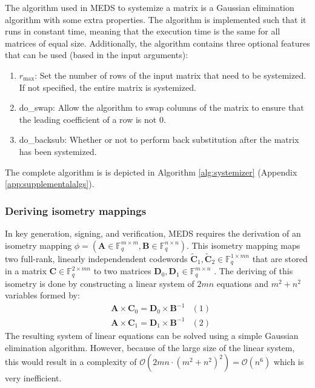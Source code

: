 \documentclass[11pt,a4paper]{report}
\theoremstyle{definition}
\begin{document}
The algorithm used in MEDS to systemize a matrix is a Gaussian elimination algorithm with some extra properties. The algorithm is implemented such that it runs in constant time, meaning that the execution time is the same for all matrices of equal size. Additionally, the algorithm contains three optional features that can be used (based in the input arguments):
\begin{enumerate}
  \item $r_{\text{max}}$: Set the number of rows of the input matrix that need to be systemized. If not specified, the entire matrix is systemized.
  \item do\_swap: Allow the algorithm to swap columns of the matrix to ensure that the leading coefficient of a row is not 0.
  \item do\_backsub: Whether or not to perform back substitution after the matrix has been systemized.
\end{enumerate}
The complete algorithm is is depicted in Algorithm \ref{alg:systemizer} (Appendix \ref{app:supplementalalgs}).

\subsubsection{Deriving isometry mappings}
\label{sec:derivingisometry}
In key generation, signing, and verification, MEDS requires the derivation of an isometry mapping $\phi = (\textbf{A} \in \mathbb{F}_q^{m \times m}, \textbf{B} \in \mathbb{F}_q^{n \times n})$. This isometry mapping maps two full-rank, linearly independendent codewords $\tilde{\textbf{C}}_1, \tilde{\textbf{C}}_2 \in \mathbb{F}_q^{1 \times mn}$ that are stored in a matrix $\textbf{C} \in \mathbb{F}_q^{2 \times mn}$ to two matrices $\textbf{D}_0, \textbf{D}_1 \in \mathbb{F}_q^{m \times n}$ \cite{chou2024reducing}. The deriving of this isometry is done by constructing a linear system of $2mn$ equations and $m^2 + n^2$ variables formed by:
\begin{align*}
  & \textbf{A} \times \textbf{C}_0 = \textbf{D}_0 \times \textbf{B}^{-1} & (1) \\
  & \textbf{A} \times \textbf{C}_1 = \textbf{D}_1 \times \textbf{B}^{-1} & (2)
\end{align*}
The resulting system of linear equations can be solved using a simple Gaussian elimination algorithm. However, because of the large size of the linear system, this would result in a complexity of $\mathcal{O}(2mn \cdot (m^2 + n^2)^2) = \mathcal{O}(n^6)$ which is very inefficient.
\end{document}
